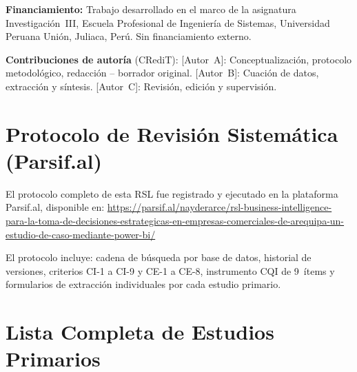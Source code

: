 \documentclass[12pt, a4paper]{article}
\begin{document}
\noindent\textbf{Financiamiento:} Trabajo desarrollado en el marco de la
asignatura Investigaci\'on~III, Escuela Profesional de Ingenier\'ia de
Sistemas, Universidad Peruana Uni\'on, Juliaca, Per\'u. Sin financiamiento
externo.

\noindent\textbf{Contribuciones de autor\'ia} (CRediT):
[Autor~A]: Conceptualizaci\'on, protocolo metodol\'ogico, redacci\'on --
borrador original.
[Autor~B]: Cuaci\'on de datos, extracci\'on y s\'intesis.
[Autor~C]: Revisi\'on, edici\'on y supervisi\'on.

\printbibliography[title={Referencias}, heading=bibintoc]

\appendix

\section{Protocolo de Revisi\'on Sistem\'atica (Parsif.al)}

El protocolo completo de esta RSL fue registrado y ejecutado en la plataforma
Parsif.al, disponible en:
\url{https://parsif.al/nayderarce/rsl-business-intelligence-para-la-toma-de-decisiones-estrategicas-en-empresas-comerciales-de-arequipa-un-estudio-de-caso-mediante-power-bi/}

El protocolo incluye: cadena de b\'usqueda por base de datos, historial de
versiones, criterios CI-1 a CI-9 y CE-1 a CE-8, instrumento CQI de 9~\'items
y formularios de extracci\'on individuales por cada estudio primario.

\section{Lista Completa de Estudios Primarios}
\end{document}
